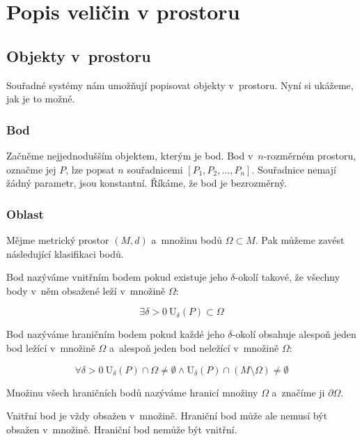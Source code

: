\chapter{Popis veličin v prostoru}


\section{Objekty v~prostoru}

Souřadné systémy nám umožňují popisovat objekty v~prostoru. Nyní si ukážeme, jak je to možné. 

\subsection{Bod}

Začněme nejjednodušším objektem, kterým je bod. Bod v~\(n\)-rozměrném prostoru, označme jej \(P\), lze popsat \(n\) souřadnicemi \([P_1, P_2, ..., P_n]\). Souřadnice nemají žádný parametr, jsou konstantní. Říkáme, že bod je bezrozměrný.

\subsection{Oblast}

Mějme metrický prostor \((M, d)\) a~množinu bodů \(\Omega \subset M\). Pak můžeme zavést následující klasifikaci bodů.

Bod nazýváme vnitřním bodem pokud existuje jeho \(\delta\)-okolí takové, že všechny body v~něm obsažené leží v~množině \(\Omega\):

\begin{equation}
\exists \delta > 0 \ \mathrm{U}_{\delta}(P) \subset \Omega
\end{equation}

Bod nazýváme hraničním bodem pokud každé jeho \(\delta\)-okolí obsahuje alespoň jeden bod ležící v~množině \(\Omega\) a~alespoň jeden bod neležící v~množině \(\Omega\):

\begin{equation}
\forall \delta > 0 \ \mathrm{U}_{\delta}(P) \cap \Omega \neq \emptyset \land \mathrm{U}_{\delta}(P) \cap (M \setminus \Omega) \neq \emptyset
\end{equation}

Množinu všech hraničních bodů nazýváme hranicí množiny \(\Omega\) a~značíme ji \(\partial \Omega\).

Vnitřní bod je vždy obsažen v~množině. Hraniční bod může ale nemusí být obsažen v~množině. Hraniční bod nemůže být vnitřní.

